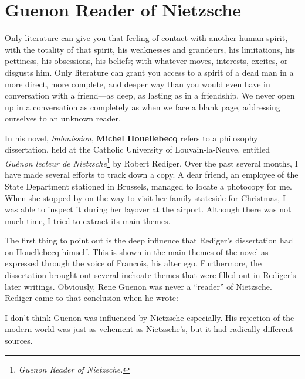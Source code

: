 \section{Guenon Reader of Nietzsche}

\label{sec:GuenonReader}

\begin{quotex}
Only literature can give you that feeling of contact with another human spirit, with the totality of that spirit, his weaknesses and grandeurs, his limitations, his pettiness, his obsessions, his beliefs; with whatever moves, interests, excites, or disgusts him. Only literature can grant you access to a spirit of a dead man in a more direct, more complete, and deeper way than you would even have in conversation with a friend---as deep, as lasting as in a friendship. We never open up in a conversation as completely as when we face a blank page, addressing ourselves to an unknown reader.
\end{quotex}


In his novel, \emph{Submission}, \textbf{Michel Houellebecq} refers to a philosophy dissertation, held at the Catholic University of Louvain-la-Neuve, entitled \emph{Guénon lecteur de Nietzsche}\footnote{\emph{Guenon Reader of Nietzsche.}} by Robert Rediger. Over the past several months, I have made several efforts to track down a copy. A dear friend, an employee of the State Department stationed in Brussels, managed to locate a photocopy for me. When she stopped by on the way to visit her family stateside for Christmas, I was able to inspect it during her layover at the airport. Although there was not much time, I tried to extract its main themes.

The first thing to point out is the deep influence that Rediger's dissertation had on Houellebecq himself. This is shown in the main themes of the novel as expressed through the voice of Francois, his alter ego. Furthermore, the dissertation brought out several inchoate themes that were filled out in Rediger's later writings. Obviously, Rene Guenon was never a ``reader'' of Nietzsche. Rediger came to that conclusion when he wrote:

\begin{quotex}
I don't think Guenon was influenced by Nietzsche especially. His rejection of the modern world was just as vehement as Nietzsche's, but it had radically different sources.
\end{quotex}



